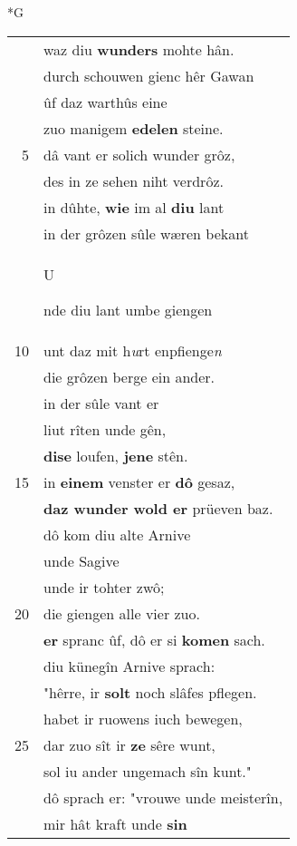 \documentclass[8pt,a4paper,notitlepage]{article}
\begin{document}
\newpage
\begin{table}[ht]
\begin{minipage}[t]{0.5\linewidth}
\small
\begin{center}*G
\end{center}
\begin{tabular}{rl}
 & waz diu \textbf{wunders} mohte hân.\\ 
 & durch schouwen gienc hêr Gawan\\ 
 & ûf daz warthûs eine\\ 
 & zuo manigem \textbf{edelen} steine.\\ 
5 & dâ vant er solich wunder grôz,\\ 
 & des in ze sehen niht verdrôz.\\ 
 & in dûhte, \textbf{wie} im al \textbf{diu} lant\\ 
 & in der grôzen sûle wæren bekant\\ 
 & \begin{large}U\end{large}nde diu lant umbe giengen\\ 
10 & unt daz mit h\textit{u}rt enpfienge\textit{n}\\ 
 & die grôzen berge ein ander.\\ 
 & in der sûle vant er\\ 
 & liut rîten unde gên,\\ 
 & \textbf{dise} loufen, \textbf{jene} stên.\\ 
15 & in \textbf{einem} venster er \textbf{dô} gesaz,\\ 
 & \textbf{daz wunder wold er} prüeven baz.\\ 
 & dô kom diu alte Arnive\\ 
 & unde Sagive\\ 
 & unde ir tohter zwô;\\ 
20 & die giengen alle vier zuo.\\ 
 & \textbf{er} spranc ûf, dô er si \textbf{komen} sach.\\ 
 & diu künegîn Arnive sprach:\\ 
 & "hêrre, ir \textbf{solt} noch slâfes pflegen.\\ 
 & habet ir ruowens iuch bewegen,\\ 
25 & dar zuo sît ir \textbf{ze} sêre wunt,\\ 
 & sol iu ander ungemach sîn kunt."\\ 
 & dô sprach er: "vrouwe unde meisterîn,\\ 
 & mir hât kraft unde \textbf{sin}\\ 

\end{tabular}
\end{minipage}
\end{table}
\end{document}
